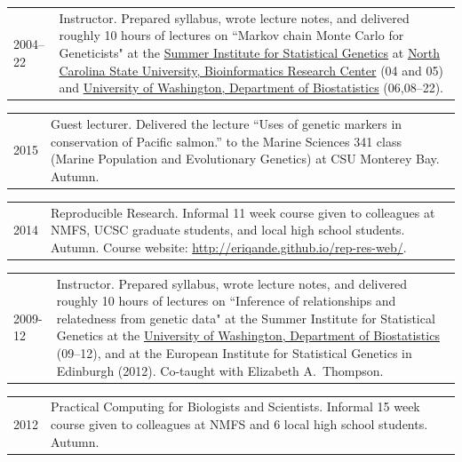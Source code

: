 \documentclass[11pt]{article}
\newlength{\myindent}
\newlength{\scndcol}
\begin{document}
\begin{tabular}{ @{}p{2.5\myindent} p{\scndcol}@{}  }
\hspace*{\myindent}2004--22 &  Instructor.  Prepared syllabus, wrote lecture notes, and delivered roughly 10 hours of lectures on ``Markov chain Monte Carlo for Geneticists" at the \href{http://www.biostat.washington.edu/sisg06/}{Summer Institute for Statistical Genetics} at    
\href{http://statgen.ncsu.edu/brcwebsite/home.php}{North Carolina State University, Bioinformatics Research Center} (04 and 05) and \href{http://www.biostat.washington.edu/}{University of Washington, Department of Biostatistics} (06,08--22).
\end{tabular}


\begin{tabular}{ @{}p{2.5\myindent} p{\scndcol}@{}  }
\hspace*{\myindent}2015 &  Guest lecturer. Delivered the lecture ``Uses of genetic markers in conservation
of Pacific salmon.'' to the Marine Sciences 341 class (Marine Population and Evolutionary Genetics) at 
CSU Monterey Bay. Autumn.
\end{tabular}


\begin{tabular}{ @{}p{2.5\myindent} p{\scndcol}@{}  }
\hspace*{\myindent}2014 &  Reproducible Research. Informal 11 week course given to colleagues at NMFS, UCSC graduate students, and local high school students. Autumn.  Course website: \url{http://eriqande.github.io/rep-res-web/}.
\end{tabular}


\begin{tabular}{ @{}p{2.5\myindent} p{\scndcol}@{}  }
\hspace*{\myindent}2009-12 &  Instructor.  Prepared syllabus, wrote lecture notes, and delivered roughly 10 hours of lectures on ``Inference of relationships and relatedness from genetic data" at the Summer Institute for Statistical Genetics at the \href{http://www.biostat.washington.edu/}{University of Washington, Department of Biostatistics} (09--12), and at the European Institute for Statistical Genetics in Edinburgh (2012). Co-taught with Elizabeth A.~Thompson.
\end{tabular}


\begin{tabular}{ @{}p{2.5\myindent} p{\scndcol}@{}  }
\hspace*{\myindent}2012 &  Practical Computing for Biologists and Scientists. Informal 15 week course given to colleagues at NMFS and 6 local high school students. Autumn.
\end{tabular}
\end{document}
